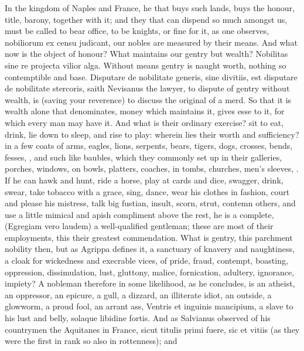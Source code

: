 {In the kingdom of Naples and France, he that buys such lands,
buys the honour, title, barony, together with it; and they that can
dispend so much amongst us, must be called to bear office, to be
knights, or fine for it, as one observes, nobiliorum ex censu
judicant, our nobles are measured by their means. And what now is the
object of honour? What maintains our gentry but wealth? Nobilitas
sine re projecta vilior alga. Without means gentry is naught worth,
nothing so contemptible and base. Disputare de nobilitate
generis, sine divitiis, est disputare de nobilitate stercoris, saith
Nevisanus the lawyer, to dispute of gentry without wealth, is (saving
your reverence) to discuss the original of a merd. So that it is wealth
alone that denominates, money which maintains it, gives esse to it, for
which every man may have it. And what is their ordinary exercise?
sit to eat, drink, lie down to sleep, and rise to play: wherein
lies their worth and sufficiency? in a few coats of arms, eagles,
lions, serpents, bears, tigers, dogs, crosses, bends, fesses, \etc{}, and
such like baubles, which they commonly set up in their galleries,
porches, windows, on bowls, platters, coaches, in tombs, churches,
men's sleeves, \etc{}. If he can hawk and hunt, ride a horse, play at
cards and dice, swagger, drink, swear, take tobacco with a grace, sing,
dance, wear his clothes in fashion, court and please his mistress, talk
big fustian, insult, scorn, strut, contemn others, and use a
little mimical and apish compliment above the rest, he is a complete,
(Egregiam vero laudem) a well-qualified gentleman; these are most of
their employments, this their greatest commendation. What is gentry,
this parchment nobility then, but as  Agrippa defines it, a
sanctuary of knavery and naughtiness, a cloak for wickedness and
execrable vices, of pride, fraud, contempt, boasting, oppression,
dissimulation, lust, gluttony, malice, fornication, adultery,
ignorance, impiety? A nobleman therefore in some likelihood, as he
concludes, is an atheist, an oppressor, an epicure, a gull, a
dizzard, an illiterate idiot, an outside, a glowworm, a proud fool, an
arrant ass, Ventris et inguinis mancipium, a slave to his lust and
belly, solaque libidine fortis. And as Salvianus observed of his
countrymen the Aquitanes in France, sicut titulis primi fuere, sic et
vitiis (as they were the first in rank so also in rottenness); and
}
